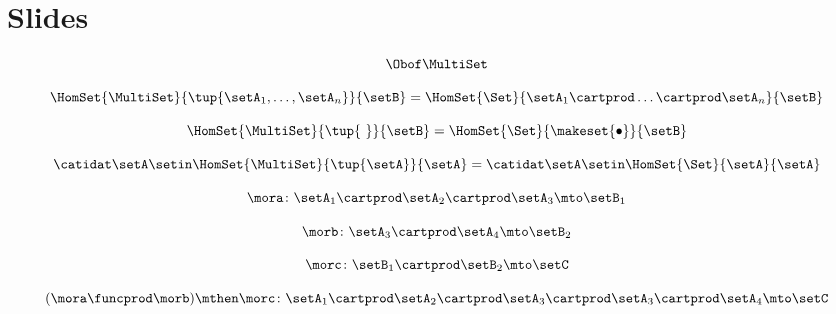 
\section{Slides}
\label{sec:multicategories-slides}

\begin{forslides}

    \begin{equation}
        \label{eq:slides_multicategories_00}
       \Obof\MultiSet
    \end{equation}
    
    \begin{equation}
        \label{eq:slides_multicategories_01}
       \HomSet{\MultiSet}{\tup{\setA_1,\ldots,\setA_n}}{\setB}=\HomSet{\Set}{\setA_1 \cartprod \ldots \cartprod \setA_n}{\setB}
    \end{equation}
    
     \begin{equation}
        \label{eq:slides_multicategories_02}
       \HomSet{\MultiSet}{\tup{ \ }}{\setB}=\HomSet{\Set}{\makeset{ \bullet }}{\setB}
    \end{equation}
    
     \begin{equation}
        \label{eq:slides_multicategories_03}
      \catidat\setA \setin \HomSet{\MultiSet}{\tup{\setA}}{\setA}=\catidat\setA \setin \HomSet{\Set}{\setA}{\setA}
    \end{equation}
    
     \begin{equation}
        \label{eq:slides_multicategories_04}
      \mora \colon \setA_1 \cartprod \setA_2 \cartprod \setA_3 \mto \setB_1
    \end{equation}
    
    \begin{equation}
        \label{eq:slides_multicategories_05}
       \morb \colon \setA_3 \cartprod \setA_4 \mto \setB_2
    \end{equation}
    
     \begin{equation}
        \label{eq:slides_multicategories_06}
       \morc \colon \setB_1 \cartprod \setB_2 \mto \setC
    \end{equation}
    
     \begin{equation}
        \label{eq:slides_multicategories_07}
      (\mora \funcprod \morb) \mthen \morc \colon \setA_1 \cartprod \setA_2 \cartprod \setA_3 \cartprod \setA_3 \cartprod \setA_4 \mto \setC
    \end{equation}
    

\end{forslides}
